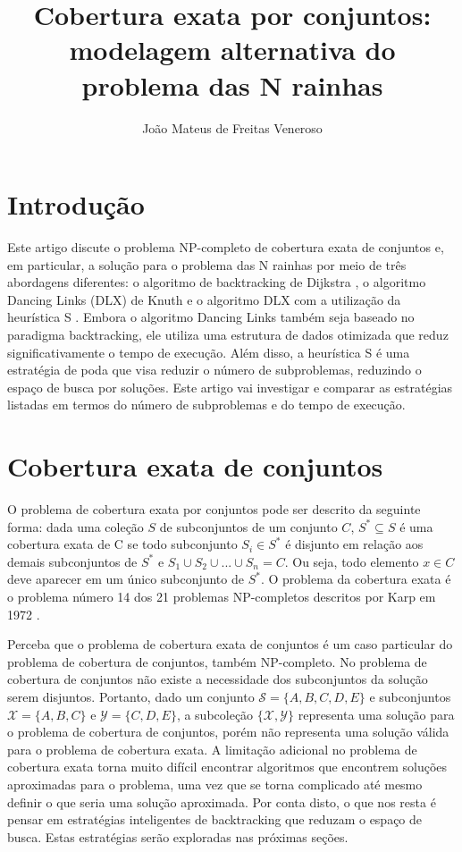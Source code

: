 \documentclass{article}
\begin{document}
\title{Cobertura exata por conjuntos: modelagem alternativa do problema das N rainhas}
\author{João Mateus de Freitas Veneroso}

\maketitle

\section{Introdução}

Este artigo discute o problema NP-completo de cobertura exata de conjuntos e, em particular,
a solução para o problema das N rainhas por meio de três abordagens diferentes: 
o algoritmo de backtracking de Dijkstra \cite{dijkstra1972}, o algoritmo Dancing Links (DLX) de Knuth e o algoritmo
DLX com a utilização da heurística S \cite{knuth2000}. Embora o algoritmo Dancing Links também seja baseado no paradigma
backtracking, ele utiliza uma estrutura de dados otimizada que reduz significativamente 
o tempo de execução. Além disso, a heurística S é uma estratégia de poda que visa reduzir o número de 
subproblemas, reduzindo o espaço de busca por soluções. Este artigo vai investigar e comparar as
estratégias listadas em termos do número de subproblemas e do tempo de execução.

\section{Cobertura exata de conjuntos}

O problema de cobertura exata por conjuntos pode ser descrito da seguinte forma: 
dada uma coleção $ S $ de subconjuntos de um conjunto $ C $, $ S^* \subseteq S $ é uma cobertura exata de C se 
todo subconjunto $S_i \in S^*$ é disjunto em relação aos demais subconjuntos de $ S^* $ e $ S_1 \cup S_2 \cup ... \cup S_n = C $. Ou
seja, todo elemento $ x \in C $ deve aparecer em um único subconjunto de $ S^* $. O problema da 
cobertura exata é o problema número 14 dos 21 problemas NP-completos descritos por Karp em 1972 \cite{karp1972}.

Perceba que o problema de cobertura exata de conjuntos é um caso particular do problema de cobertura de conjuntos, também
NP-completo. No problema de cobertura de conjuntos não existe a necessidade dos subconjuntos da solução serem disjuntos.
Portanto, dado um conjunto $ \mathcal{S} = \{ A, B, C, D, E \} $ e subconjuntos $ \mathcal{X} = \{ A, B, C \} $ e 
$ \mathcal{Y} = \{ C, D, E \} $, a subcoleção
$ \{ \mathcal{X}, \mathcal{Y} \} $ representa uma solução para o problema de cobertura de conjuntos, porém não representa uma solução válida para 
o problema de cobertura exata. A limitação adicional no problema de cobertura exata torna muito difícil encontrar 
algoritmos que encontrem soluções aproximadas para o problema, uma vez que se torna complicado até mesmo definir o que 
seria uma solução aproximada. Por conta disto, o que nos resta é pensar em estratégias inteligentes
de backtracking que reduzam o espaço de busca. Estas estratégias serão exploradas nas próximas seções.
\end{document}
